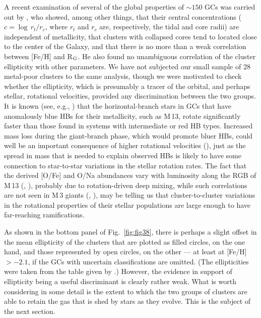 \documentclass[12pt,preprint]{aastex}
\begin{document}
A recent examination of several of the global properties of $\sim 150$ GCs was
carried out by \citet{vsid11}, who showed, among other things, that their
central concentrations ($c = \log\,r_t/r_c$, where $r_t$ and $r_c$ are,
respectively, the tidal and core radii) are independent of metallicity, that
clusters with collapsed cores tend to located close to the center of the Galaxy,
and that there is no more than a weak correlation between [Fe/H] and
R$_{\rm G}$.  He also found no unambiguous correlation of the cluster
ellipticity with other parameters.  We have not subjected our small sample of
28 metal-poor clusters to the same analysis, though we were motivated to check
whether the ellipticity, which is presumably a tracer of the orbital, and
perhaps stellar, rotational velocities, provided any discrimination between the
two groups.  It is known (see, e.g., \citealt[and references therein]{pet83})
that the horizontal-branch stars in GCs that have anomalously blue HBs for
their metallicity, such as M$\,$13, rotate significantly faster than those
found in systems with intermediate or red HB types.  Increased mass loss during
the giant-branch phase, which would promote bluer HBs, could well be an
important consequence of higher rotational velocities (\citealt{fr75}), just as
the spread in mass that is needed to explain observed HBs is likely to have some
connection to star-to-star variations in the stellar rotation rates.  The fact
that the derived [O/Fe] and O/Na abundances vary with luminosity along the RGB
of M$\,$13 (\citealt{jp12}, \citealt{kss97}), probably due to rotation-driven
deep mixing, while such correlations are not seen in M$\,$3 giants
(\citealt{skg04}, \citealt{cm05a}), may be telling us that cluster-to-cluster
variations in the rotational properties of their stellar populations are large
enough to have far-reaching ramifications.

As shown in the bottom panel of Fig.~\ref{fig:fig38}, there is perhaps a 
slight offset in the mean ellipticity of the clusters that are plotted as filled
circles, on the one hand, and those represented by open circles, on the other
--- at least at [Fe/H] $> -2.1$, if the GCs with uncertain classifications are
omitted.  (The ellipticities were taken from the table given by
\citealt{vsid11}.)   However, the evidence in support of ellipticity being a
useful discriminant is clearly rather weak.  What is worth considering in some
detail is the extent to which the two groups of clusters are able to retain the
gas that is shed by stars as they evolve.  This is the subject of the next
section.
\end{document}
